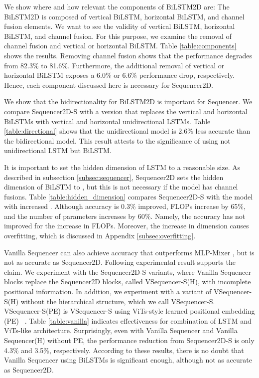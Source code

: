 \documentclass{article}
\begin{document}
We show where and how relevant the components of BiLSTM2D are: The BiLSTM2D is composed of vertical BiLSTM, horizontal BiLSTM, and channel fusion elements. We want to see the validity of vertical BiLSTM, horizontal BiLSTM, and channel fusion. For this purpose, we examine the removal of channel fusion and vertical or horizontal BiLSTM. Table \ref{table:components} shows the results. Removing channel fusion shows that the performance degrades from 82.3\% to 81.6\%. Furthermore, the additional removal of vertical or horizontal BiLSTM exposes a 6.0\% or 6.6\% performance drop, respectively. Hence, each component discussed here is necessary for Sequencer2D.

We show that the bidirectionality for BiLSTM2D is important for Sequencer. We compare Sequencer2D-S with a version that replaces the vertical and horizontal BiLSTMs with vertical and horizontal unidirectional LSTMs. Table \ref{table:directional} shows that the unidirectional model is 2.6\% less accurate than the bidirectional model. This result attests to the significance of using not unidirectional LSTM but BiLSTM.

It is important to set the hidden dimension of LSTM to a reasonable size. As described in subsection \ref{subsec:sequencer}, Sequencer2D sets the hidden dimension  of BiLSTM to , but this is not necessary if the model has channel fusions. Table \ref{table:hidden_dimension} compares Sequencer2D-S with the model with increased . Although accuracy is 0.3\% improved, FLOPs increase by 65\%, and the number of parameters increases by 60\%. Namely, the accuracy has not improved for the increase in FLOPs. Moreover, the increase in dimension causes overfitting, which is discussed in Appendix \ref{subsec:overfitting}.

Vanilla Sequencer can also achieve accuracy that outperforms MLP-Mixer \cite{tolstikhin2021mlp}, but is not as accurate as Sequencer2D. Following experimental result supports the claim. We experiment with the Sequencer2D-S variants, where Vanilla Sequencer blocks replace the Sequencer2D blocks, called VSequencer-S(H), with incomplete positional information. In addition, we experiment with a variant of VSequencer-S(H) without the hierarchical structure, which we call VSequencer-S. VSequencer-S(PE) is VSequencer-S using ViTs-style learned positional embedding (PE) ~\cite{dosovitskiy2020image}. Table \ref{table:vanilla} indicates effectiveness for combination of LSTM and ViTs-like architecture. Surprisingly, even with Vanilla Sequencer and Vanilla Sequencer(H) without PE, the performance reduction from Sequencer2D-S is only 4.3\% and 3.5\%, respectively. According to these results, there is no doubt that Vanilla Sequencer using BiLSTMs is significant enough, although not as accurate as Sequencer2D.
\end{document}
